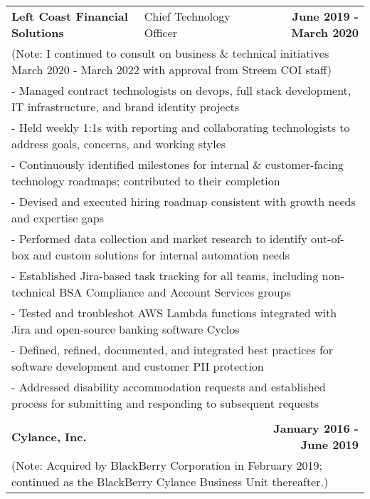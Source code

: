 \documentclass[letterpaper]{article}
\begin{document}
\begin{center}
\begin{tabular}{p{}p{}r}
			\\
				\textbf{Left Coast Financial Solutions} &
				\quad\quad\quad\quad\quad Chief Technology Officer &
				\textbf{June 2019 - March 2020\quad}
			\\
				\multicolumn{3}{p{\textwidth}}{(Note: I continued to consult on business \& technical initiatives March 2020 - March 2022 with approval from Streem COI staff)}
			\\
				\multicolumn{3}{p{\textwidth}}{\quad\quad - Managed contract technologists on devops, full stack development, IT infrastructure, and brand identity projects} 
			\\				
				\multicolumn{3}{p{\textwidth}}{\quad\quad - Held weekly 1:1s with reporting and collaborating technologists to address goals, concerns, and working styles} 
			\\
				\multicolumn{3}{p{\textwidth}}{\quad\quad - Continuously identified milestones for internal \& customer-facing technology roadmaps; contributed to their completion} 
			\\
				\multicolumn{3}{p{\textwidth}}{\quad\quad - Devised and executed hiring roadmap consistent with growth needs and expertise gaps} 
			\\
				\multicolumn{3}{p{\textwidth}}{\quad\quad - Performed data collection and market research to identify out-of-box and custom solutions for internal automation needs}  
			\\
				\multicolumn{3}{p{\textwidth}}{\quad\quad - Established Jira-based task tracking for all teams, including non-technical BSA Compliance and Account Services groups}
			\\
				\multicolumn{3}{p{\textwidth}}{\quad\quad - Tested and troubleshot AWS Lambda functions integrated with Jira and open-source banking software Cyclos} 
			\\
				\multicolumn{3}{p{\textwidth}}{\quad\quad - Defined, refined, documented, and integrated best practices for software development and customer PII protection}
			\\
				\multicolumn{3}{p{\textwidth}}{\quad\quad - Addressed disability accommodation requests and established process for submitting and responding to subsequent requests}
			\\
			\\
				\textbf{Cylance, Inc.} & &
				\textbf{January 2016 - June 2019\quad}
			\\		%
				\multicolumn{3}{p{\textwidth}}{(Note: Acquired by BlackBerry Corporation in February 2019; continued as the BlackBerry Cylance Business Unit thereafter.)}

\end{tabular}
\end{center}
\end{document}
